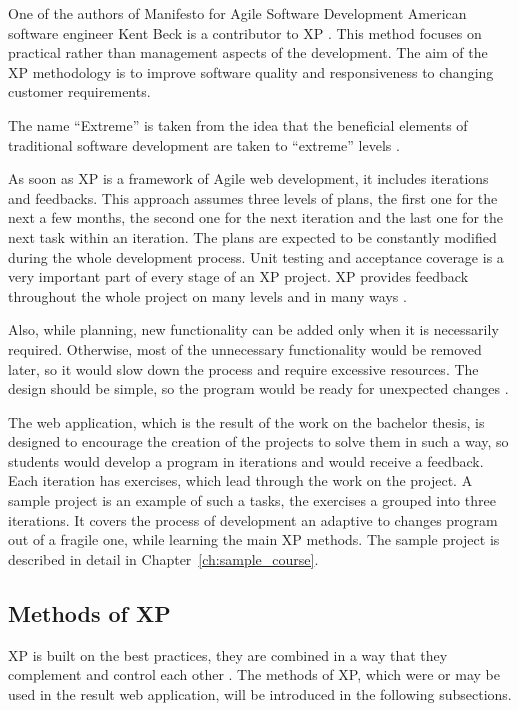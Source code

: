 One of the authors of Manifesto for Agile Software Development American software engineer Kent Beck is a contributor to XP \cite{xp_explained}. This method focuses on practical rather than management aspects of the development. The aim of the XP methodology is to improve software quality and responsiveness to changing customer requirements.

The name ``Extreme'' is taken from the idea that the beneficial elements of traditional software development are taken to ``extreme'' levels \cite[Preface]{xp_explained}.

As soon as XP is a framework of Agile web development, it includes iterations and feedbacks. This approach assumes three levels of plans, the first one for the next a few months, the second one for the next iteration and the last one for the next task within an iteration. The plans are expected to be constantly modified during the whole development process. Unit testing and acceptance coverage is a very important part of every stage of an XP project. XP provides feedback throughout the whole project on many levels and in many ways \cite[Planning/Feedback loops]{xp_intro}.

Also, while planning, new functionality can be added only when it is necessarily required. Otherwise, most of the unnecessary functionality would be removed later, so it would slow down the process and require excessive resources. The design should be simple, so the program would be ready for unexpected changes \cite{xp_early}.

The web application, which is the result of the work on the bachelor thesis, is designed to encourage the creation of the projects to solve them in such a way, so students would develop a program in iterations and would receive a feedback. Each iteration has exercises, which lead through the work on the project. A sample project is an example of such a tasks, the exercises a grouped into three iterations. It covers the process of development an adaptive to changes program out of a fragile one, while learning the main XP methods. The sample project is described in detail in Chapter~\ref{ch:sample_course}.

\subsection{Methods of XP}
XP is built on the best practices, they are combined in a way that they complement and control each other \cite[Foreword]{xp_explained}. The methods of XP, which were or may be used in the result web application, will be introduced in the following subsections.

